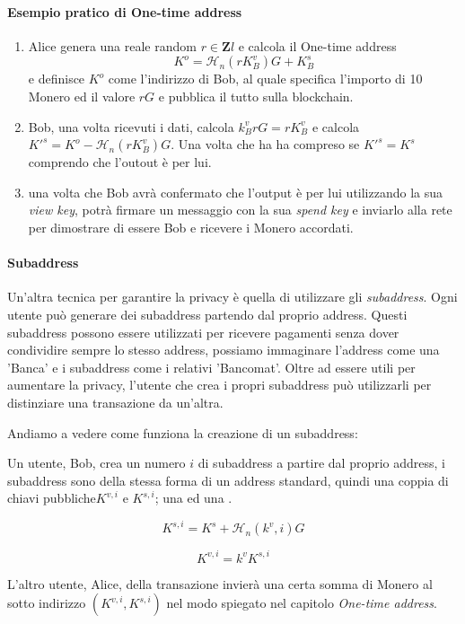 \documentclass[12pt,a4paper]{article}
\begin{document}
\paragraph{Esempio pratico di One-time address}

\begin{enumerate}
    \item Alice genera una reale random $r \in \mathbf{Z}l $ e calcola il
    One-time address $$ K^{o} = \mathcal{H}_n(rK^v_B)G+K^s_B $$ e definisce
    $K^{o}$ come l'indirizzo di Bob, al quale specifica l'importo di 10 Monero
    ed il valore $rG$ e pubblica il tutto sulla blockchain.
    \item Bob, una volta ricevuti i dati, calcola $k^v_BrG = rK^v_B$ e calcola
    ${K'}^s = K^o - \mathcal{H}_n(rK^v_B)G$. Una volta che ha ha compreso se
    $K'^s = K^s$ comprendo che l'outout è per lui.
    \item una volta che Bob avrà confermato che l'output è per lui utilizzando
    la sua \textit{view key}, potrà firmare un messaggio con la sua
    \textit{spend key} e inviarlo alla rete per dimostrare di essere Bob e
    ricevere i Monero accordati.
\end{enumerate}

\paragraph{Subaddress}
Un'altra tecnica per garantire la privacy è quella di utilizzare gli
\textit{subaddress}. Ogni utente può generare dei subaddress partendo dal
proprio address. Questi subaddress possono essere utilizzati per ricevere
pagamenti senza dover condividire sempre lo stesso address, possiamo immaginare
l'address come una 'Banca' e i subaddress come i relativi 'Bancomat'. Oltre ad
essere utili per aumentare la privacy, l'utente che crea i propri subaddress può
utilizzarli per distinziare una transazione da un'altra.

Andiamo a vedere come funziona la creazione di un subaddress:

Un utente, Bob, crea un numero $ i $ di subaddress a partire dal proprio
address, i subaddress sono della stessa forma di un address standard, quindi una
coppia di chiavi pubbliche$ K^{v,i} $ e $ K^{s,i} $; una  ed una
.

$$ K^{s,i} = K^s + \mathcal{H}_n(k^v, i)G $$ 

$$ K^{v,i} = k^vK^{s,i} $$

L'altro utente, Alice, della transazione invierà una certa somma di Monero al
sotto indirizzo $ (K^{v,i}, K^{s,i}) $ nel modo spiegato nel capitolo
\textit{One-time address}.
\end{document}
